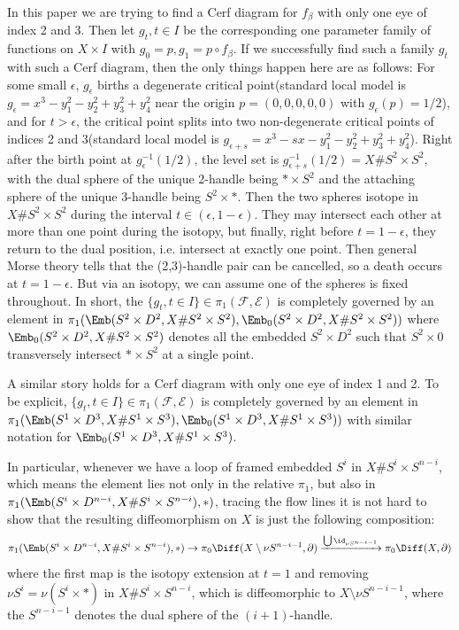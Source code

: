 In this paper we are trying to find a Cerf diagram for $f_\beta$ with only one eye of index 2 and 3. Then let $g_t, t\in I$ be the corresponding one parameter family of functions on $X\times I$ with $g_0=p, g_1=p\circ f_\beta$. If we successfully find such a family $g_t$ with such a Cerf diagram, then the only things happen here are as follows: For some small $\epsilon$, $g_\epsilon$ births a degenerate critical point(standard local model is $g_\epsilon=x^3-y_1^2-y_2^2+y_3^2+y_4^2$ near the origin $p=(0,0,0,0,0
)$ with $g_\epsilon(p)=1/2$), and for $t> \epsilon$, the critical point splits into two non-degenerate critical points of indices 2 and 3(standard local model is $g_{\epsilon+s}=x^3-sx-y_1^2-y_2^2+y_3^2+y_4^2$). Right after the birth point at $g_\epsilon^{-1}(1/2)$, the level set is $g_{\epsilon+s}^{-1}(1/2)=X\# S^2\times S^2$, with the dual sphere of the unique 2-handle being $*\times S^2$ and the attaching sphere of the unique 3-handle being $S^2\times *$. Then the two spheres isotope in $X\# S^2\times S^2$ during the interval $t\in (\epsilon, 1-\epsilon)$. They may intersect each other at more than one point during the isotopy, but finally, right before $t=1-\epsilon$, they return to the dual position, i.e. intersect at exactly one point. Then general Morse theory tells that the (2,3)-handle pair can be cancelled, so a death occurs at $t=1-\epsilon$. But via an isotopy, we can assume one of the spheres is fixed throughout. In short, the $\{g_t,t\in I\}\in \pi_1(\mathcal{F},\mathcal{E})$ is completely governed by an element in $\pi_1(\Emb(S^2\times D^2, X\# S^2\times S^2), \Emb_0(S^2\times D^2, X\# S^2\times S^2))$ where $\Emb_0(S^2\times D^2, X\# S^2\times S^2)$ denotes all the embedded $S^2\times D^2$ such that $S^2\times 0$ transversely intersect $*\times S^2$ at a single point.

A similar story holds for a Cerf diagram with only one eye of index 1 and 2. To be explicit, $\{g_t,t\in I\}\in \pi_1(\mathcal{F},\mathcal{E})$ is completely governed by an element in $\pi_1(\Emb(S^1\times D^3, X\# S^1\times S^3), \Emb_0(S^1\times D^3, X\# S^1\times S^3))$ with similar notation for $\Emb_0(S^1\times D^3, X\# S^1\times S^3)$.

In particular, whenever we have a loop of framed embedded $S^i$ in $X\# S^i\times S^{n-i}$, which means the element lies not only in the relative $\pi_1$, but also in $\pi_1(\Emb(S^i\times D^{n-i}, X\# S^i\times S^{n-i}),*)$, tracing the flow lines it is not hard to show that the resulting diffeomorphism on $X$ is just the following composition:
$$\pi_1(\Emb(S^i\times D^{n-i}, X\# S^i\times S^{n-i}),*)\to \pi_0\Diff(X\setminus \nu S^{n-i-1},\partial)\xrightarrow{\bigcup \id_{\nu S^{n-i-1}}}\pi_0\Diff(X,\partial)$$
where the first map is the isotopy extension at $t=1$ and removing $\nu S^i=\nu (S^i\times *)$ in $X\# S^i\times S^{n-i}$, which is diffeomorphic to $X\setminus \nu S^{n-i-1}$, where the $S^{n-i-1}$ denotes the dual sphere of the $(i+1)$-handle.

